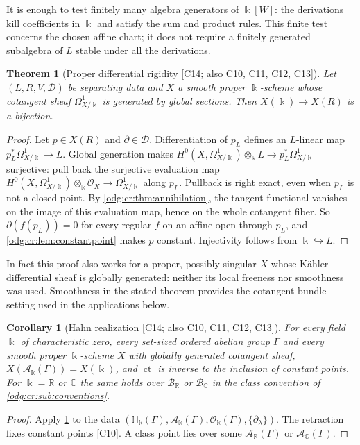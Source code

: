 \documentclass[11pt,oneside]{article}
\numberwithin{equation}{section}
\newtheorem{theorem}{Theorem}[section]
\newtheorem{corollary}[corollary]{Corollary}
\theoremstyle{definition}
\theoremstyle{remark}
\newcommand{\R}{\mathbb R}
\newcommand{\C}{\mathbb C}
\newcommand{\BR}{\mathcal B_{\R}}
\newcommand{\BC}{\mathcal B_{\C}}
\newcommand{\ct}{\operatorname{ct}}
\newcommand{\src}[1]{\textup{\textsf{\small[#1]}}}
\newcommand{\crH}{\mathbb H_\Bbbk(\Gamma)}
\newcommand{\crA}{\mathcal A_\Bbbk(\Gamma)}
\newcommand{\crO}{\mathcal O_\Bbbk(\Gamma)}
\begin{document}
It is enough to test finitely many algebra generators of $\Bbbk[W]$:
the derivations kill coefficients in $\Bbbk$ and satisfy the sum and
product rules. This finite test concerns the chosen affine chart; it
does not require a finitely generated subalgebra of $L$ stable under
all the derivations.

\begin{theorem}[Proper differential rigidity \src{C14; also C10, C11, C12, C13}]\label{odg:cr:thm:proper}
Let $(L,R,V,\mathcal D)$ be separating data and $X$ a smooth proper $\Bbbk$-scheme
whose cotangent sheaf $\Omega^1_{X/\Bbbk}$ is generated by global sections. Then
$X(\Bbbk)\to X(R)$ is a bijection.
\end{theorem}
\begin{proof}
Let $p\in X(R)$ and $\partial\in\mathcal D$. Differentiation of $p_L$ defines an
$L$-linear map $p_L^*\Omega^1_{X/\Bbbk}\to L$. Global generation makes
$H^0(X,\Omega^1_{X/\Bbbk})\otimes_\Bbbk L\to p_L^*\Omega^1_{X/\Bbbk}$ surjective:
pull back the surjective evaluation map
$H^0(X,\Omega^1_{X/\Bbbk})\otimes_\Bbbk\mathcal O_X\to\Omega^1_{X/\Bbbk}$
along $p_L$. Pullback is right exact, even when $p_L$ is not a closed
point. By \cref{odg:cr:thm:annihilation}, the tangent functional vanishes
on the image of this evaluation map, hence on the whole cotangent fiber. So
$\partial(f(p_L))=0$ for every regular $f$ on an affine open through $p_L$, and
\cref{odg:cr:lem:constantpoint} makes $p$ constant. Injectivity follows from
$\Bbbk\hookrightarrow L$.
\end{proof}

In fact this proof also works for a proper, possibly singular $X$ whose
K\"ahler differential sheaf is globally generated: neither its local
freeness nor smoothness was used. Smoothness in the stated theorem
provides the cotangent-bundle setting used in the applications below.

\begin{corollary}[Hahn realization \src{C14; also C10, C11, C12, C13}]\label{odg:cr:cor:hahnproper}
For every field $\Bbbk$ of characteristic zero, every set-sized ordered abelian
group $\Gamma$ and every smooth proper $\Bbbk$-scheme $X$ with globally generated
cotangent sheaf, $X(\crA)=X(\Bbbk)$, and $\ct$ is inverse to the inclusion of
constant points. For $\Bbbk=\R$ or $\C$ the same holds over $\BR$ or $\BC$ in the
class convention of \cref{odg:cr:sub:conventions}.
\end{corollary}
\begin{proof}
Apply \cref{odg:cr:thm:proper} to the data $(\crH,\crA,\crO,\{\partial_\lambda\})$.
The retraction fixes constant points \src{C10}. A class point lies over some
$\mathcal A_\R(\Gamma)$ or $\mathcal A_\C(\Gamma)$.
\end{proof}
\end{document}

